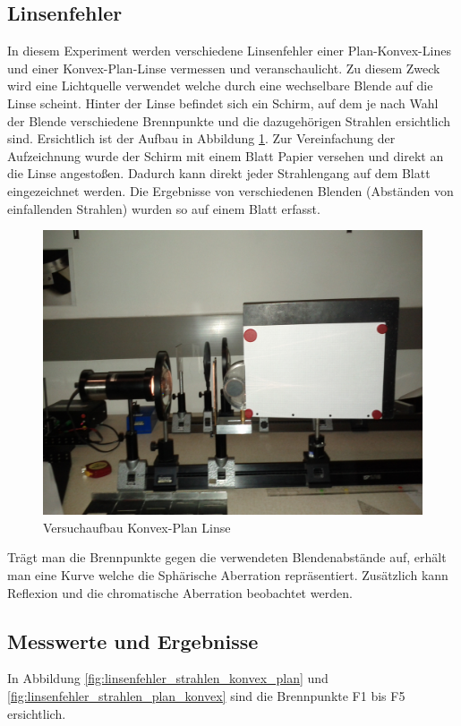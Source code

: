 \documentclass[12pt,a4paper]{article}
\begin{document}
\begin{multicols}{2}
\section{Linsenfehler}
In diesem Experiment werden verschiedene Linsenfehler einer Plan-Konvex-Lines und einer Konvex-Plan-Linse vermessen und veranschaulicht. Zu diesem Zweck wird eine Lichtquelle verwendet welche durch eine wechselbare Blende auf die Linse scheint. Hinter der Linse befindet sich ein Schirm, auf dem je nach Wahl der Blende verschiedene Brennpunkte und die dazugehörigen Strahlen ersichtlich sind. Ersichtlich ist der Aufbau in Abbildung \ref{fig:linsenfehler_aufbau}. Zur Vereinfachung der Aufzeichnung wurde der Schirm mit einem Blatt Papier versehen und direkt an die Linse angestoßen. Dadurch kann direkt jeder Strahlengang auf dem Blatt eingezeichnet werden. Die Ergebnisse von verschiedenen Blenden (Abständen von einfallenden Strahlen) wurden so auf einem Blatt erfasst.
\begin{figure}[H]
	\centering
	\includegraphics[scale=0.08]{./figure/linsenfehler.jpg}
	\caption{Versuchaufbau Konvex-Plan Linse}
	\label{fig:linsenfehler_aufbau}
\end{figure}
\noindent
Trägt man die Brennpunkte gegen die verwendeten Blendenabstände auf, erhält man eine Kurve welche die Sphärische Aberration repräsentiert. Zusätzlich kann Reflexion und die chromatische Aberration beobachtet werden.
\subsection{Messwerte und Ergebnisse}
In Abbildung \ref{fig:linsenfehler_strahlen_konvex_plan} und \ref{fig:linsenfehler_strahlen_plan_konvex} sind die Brennpunkte F1 bis F5 ersichtlich. 
\end{multicols}
\end{document}
